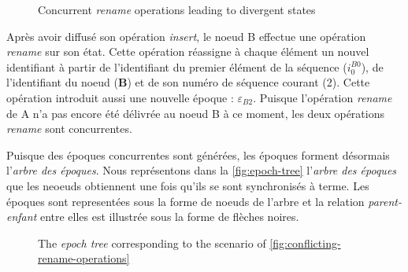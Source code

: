 \documentclass[12pt]{thesul}
\newcommand{\trm}[1]{\mathit{#1}}
\newcommand{\id}[3]{$\trm{#1}^{\trm{#2}}_{\trm{#3}}$}
\newcommand{\epoch}[1]{$\varepsilon_{#1}$}
\begin{document}
\begin{figure}[!ht]
  \caption{Concurrent \emph{rename} operations leading to divergent states}
  \label{fig:conflicting-rename-operations}
\end{figure}

Après avoir diffusé son opération \emph{insert}, le noeud B effectue une opération \emph{rename} sur son état.
Cette opération réassigne à chaque élément un nouvel identifiant à partir de l'identifiant du premier élément de la séquence (\id{i}{B0}{0}), de l'identifiant du noeud (\textbf{B}) et de son numéro de séquence courant (2).
Cette opération introduit aussi une nouvelle époque : \epoch{B2}.
Puisque l'opération \emph{rename} de A n'a pas encore été délivrée au noeud B à ce moment, les deux opérations \emph{rename} sont concurrentes.

Puisque des époques concurrentes sont générées, les époques forment désormais l'\emph{arbre des époques}.
Nous représentons dans la \autoref{fig:epoch-tree} l'\emph{arbre des époques} que les neoeuds obtiennent une fois qu'ils se sont synchronisés à terme.
Les époques sont representées sous la forme de noeuds de l'arbre et la relation \emph{parent-enfant} entre elles est illustrée sous la forme de flèches noires.

\begin{figure}[!ht]
  \centering
  \caption{The \emph{epoch tree} corresponding to the scenario of \autoref{fig:conflicting-rename-operations}}
  \label{fig:epoch-tree}
\end{figure}
\end{document}
